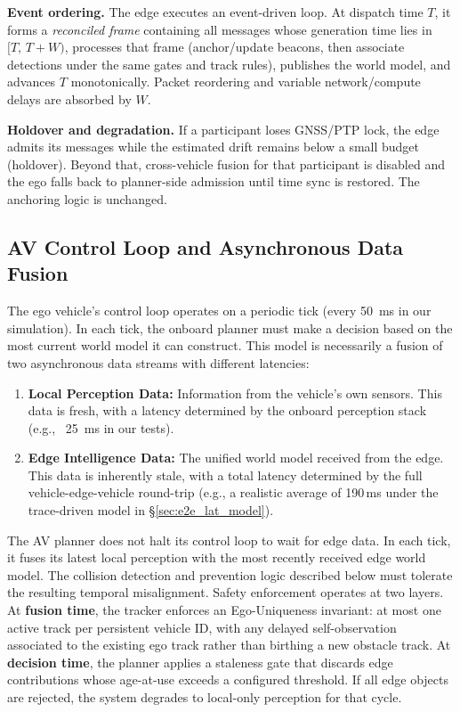 \textbf{Event ordering.}
The edge executes an event-driven loop. At dispatch time \(T\), it forms a \emph{reconciled frame} containing all messages whose generation time lies in \([T,\,T{+}W)\), processes that frame (anchor/update beacons, then associate detections under the same gates and track rules), publishes the world model, and advances \(T\) monotonically. Packet reordering and variable network/compute delays are absorbed by \(W\).

\textbf{Holdover and degradation.}
If a participant loses GNSS/PTP lock, the edge admits its messages while the estimated drift remains below a small budget (holdover). Beyond that, cross-vehicle fusion for that participant is disabled and the ego falls back to planner-side admission until time sync is restored. The anchoring logic is unchanged.

\subsection{AV Control Loop and Asynchronous Data Fusion}
\label{sec:design:control-loop}
The ego vehicle's control loop operates on a periodic tick (every 50~ms in our simulation). In each tick, the onboard planner must make a decision based on the most current world model it can construct. This model is necessarily a fusion of two asynchronous data streams with different latencies:

\begin{enumerate}[label=\arabic*.,noitemsep,topsep=0pt,leftmargin=1.2\parindent]
    \item \textbf{Local Perception Data:} Information from the vehicle's own sensors. This data is fresh, with a latency determined by the onboard perception stack (e.g., ~25~ms in our tests).
    \item \textbf{Edge Intelligence Data:} The unified world model received from the edge. This data is inherently stale, with a total latency determined by the full vehicle-edge-vehicle round-trip (e.g., a realistic average of 190\,ms under the trace-driven model in \S\ref{sec:e2e_lat_model}).
\end{enumerate}

The AV planner does not halt its control loop to wait for edge data. In each tick, it fuses its latest local perception with the most recently received edge world model. The collision detection and prevention logic described below must tolerate the resulting temporal misalignment.
Safety enforcement operates at two layers.
At \textbf{fusion time}, the tracker enforces an Ego-Uniqueness invariant: at most one active track per persistent vehicle ID, with any delayed self-observation associated to the existing ego track rather than birthing a new obstacle track.
At \textbf{decision time}, the planner applies a staleness gate that discards edge contributions whose age-at-use exceeds a configured threshold. If all edge objects are rejected, the system degrades to local-only perception for that cycle.




